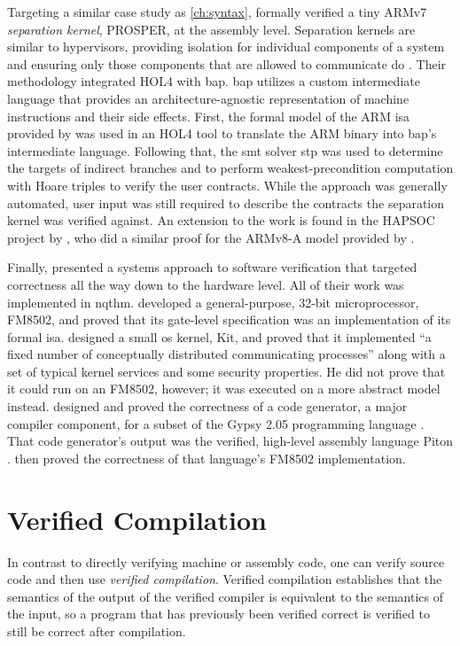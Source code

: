 Targeting a similar case study as \cref{ch:syntax},
\textcite{dam2013hypervisor,dam2013formal}
formally verified a tiny ARMv7 \emph{separation kernel},%
PROSPER, at the assembly level.
Separation kernels are similar to hypervisors,
providing isolation for individual components of a system and ensuring
only those components that are allowed to communicate do \autocite{rushby1981dvss}.
Their methodology integrated HOL4 with \ac{bap}.
\Ac{bap} utilizes a custom intermediate language
that provides an architecture-agnostic representation of machine instructions
and their side effects.
First, the formal model of the ARM \ac{isa} provided by \textcite{fox2010arm} was used
in an HOL4 tool to translate the ARM binary into \ac{bap}'s intermediate language.
Following that, the \ac{smt} solver \ac{stp}  \autocite{ganesh2007stp}
was used to determine the targets of indirect branches
and to perform weakest-precondition computation with Hoare triples
to verify the user contracts.
While the approach was generally automated,
user input was still required to describe the contracts
the separation kernel was verified against.
An extension to the work is found in the HAPSOC project by \textcite{baumann2016high},
who did a similar proof for the ARMv8-A model provided by \textcite{fox2015improved}.

Finally, \textcite{bevier1989approach} presented a systems approach
to software verification that targeted correctness
all the way down to the hardware level.
All of their work was implemented in \ac{nqthm}.
\Textcite{hunt1989microprocessor} developed a general-purpose, 32-bit microprocessor,
FM8502, and proved that its gate-level specification
was an implementation of its formal \ac{isa}.
\Textcite{bevier1989short,bevier1989kit,bevier1987verified}
designed a small \ac{os} kernel, Kit, and proved that it implemented
``a fixed number of conceptually distributed communicating processes''
along with a set of typical kernel services and some security properties.
He did not prove that it could run on an FM8502, however;
it was executed on a more abstract model instead.
\Textcite{young1989generator} designed and proved the correctness of a code generator,
a major compiler component, for a subset of the Gypsy 2.05 programming language
\autocite{good1986gypsy}. That code generator's output was
the verified, high-level assembly language Piton \autocite{moore1988piton}.
\Textcite{moore1989language} then proved the correctness
of that language's FM8502 implementation.

\section{Verified Compilation}\label{se:verified}
In contrast to directly verifying machine or assembly code,
one can verify source code and then use \emph{verified compilation}.%
Verified compilation establishes that
the semantics of the output of the verified compiler
is equivalent to the semantics of the input,
so a program that has previously been verified correct
is verified to still be correct after compilation.

